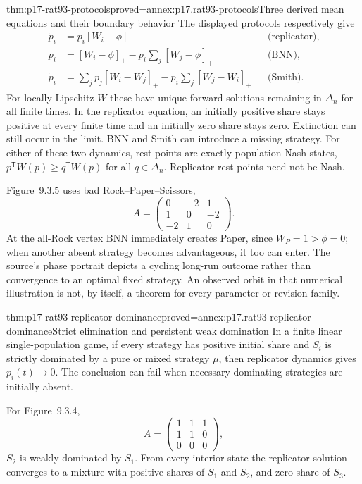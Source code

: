 \begin{hbtheorem}{thm:p17-rat93-protocols}{proved=annex:p17.rat93-protocols}{Three derived mean equations and their boundary behavior}
The displayed protocols respectively give
\[
\begin{aligned}
 \dot p_i&=p_i[W_i-\phi] &&\text{(replicator)},\\
 \dot p_i&=[W_i-\phi]_+-p_i\sum_j[W_j-\phi]_+
                                      &&\text{(BNN)},\\
 \dot p_i&=\sum_jp_j[W_i-W_j]_+-p_i\sum_j[W_j-W_i]_+
                                      &&\text{(Smith)}.
\end{aligned}
\]
For locally Lipschitz \(W\) these have unique forward solutions
remaining in \(\Delta_n\) for all finite times. In the replicator
equation, an initially positive share stays positive at every finite
time and an initially zero share stays zero. Extinction can still
occur in the limit. BNN and Smith can introduce a missing strategy.
For either of these two dynamics, rest points are exactly population
Nash states, \(p^{\mathsf T}W(p)\geq q^{\mathsf T}W(p)\) for all
\(q\in\Delta_n\). Replicator rest points need not be Nash.
\end{hbtheorem}

Figure~9.3.5 uses bad Rock--Paper--Scissors,
\[
 A=\begin{pmatrix}0&-2&1\\1&0&-2\\-2&1&0\end{pmatrix}.
\]
At the all-Rock vertex BNN immediately creates Paper, since
\(W_P=1>\phi=0\); when another absent strategy becomes advantageous,
it too can enter. The source's phase portrait depicts a cycling
long-run outcome rather than convergence to an optimal fixed strategy.
An observed orbit in that numerical illustration is not, by itself,
a theorem for every parameter or revision family.
\cite[Sec.~4, pp.~556--559]{Alexander2021EvolutionaryGames}

\begin{hbtheorem}{thm:p17-rat93-replicator-dominance}{proved=annex:p17.rat93-replicator-dominance}{Strict elimination and persistent weak domination}
In a finite linear single-population game, if every strategy has
positive initial share and \(S_i\) is strictly dominated by a pure
or mixed strategy \(\mu\), then replicator dynamics gives
\(p_i(t)\to0\). The conclusion can fail when necessary dominating
strategies are initially absent.

For Figure~9.3.4,
\[
 A=\begin{pmatrix}1&1&1\\1&1&0\\0&0&0\end{pmatrix},
\]
\(S_2\) is weakly dominated by \(S_1\). From every interior state
the replicator solution converges to a mixture with positive shares
of \(S_1\) and \(S_2\), and zero share of \(S_3\).
\end{hbtheorem}

